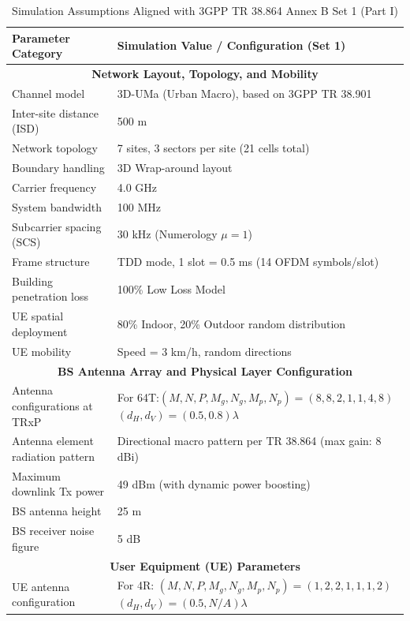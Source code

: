 \begin{table}[htbp]
\centering
\caption{Simulation Assumptions Aligned with 3GPP TR 38.864 Annex B Set 1 (Part I)}
\label{tab:appendix_3gpp_set1_part1}
\renewcommand{\arraystretch}{1.25}
\begin{tabularx}{\textwidth}{|p{}|X|}
\hline
\textbf{Parameter Category} & \textbf{Simulation Value / Configuration (Set 1)} \\ \hline
\multicolumn{2}{|c|}{\textbf{Network Layout, Topology, and Mobility}} \\ \hline
Channel model & 3D-UMa (Urban Macro), based on 3GPP TR 38.901 \\ \hline
Inter-site distance (ISD) & 500 m \\ \hline
Network topology & 7 sites, 3 sectors per site (21 cells total) \\ \hline
Boundary handling & 3D Wrap-around layout \\ \hline
Carrier frequency & 4.0 GHz \\ \hline
System bandwidth & 100 MHz \\ \hline
Subcarrier spacing (SCS) & 30 kHz (Numerology $\mu = 1$) \\ \hline
Frame structure & TDD mode, 1 slot = 0.5 ms (14 OFDM symbols/slot) \\ \hline
Building penetration loss & 100\% Low Loss Model \\ \hline
UE spatial deployment & 80\% Indoor, 20\% Outdoor random distribution \\ \hline
UE mobility & Speed = 3 km/h, random directions \\ \hline
\multicolumn{2}{|c|}{\textbf{BS Antenna Array and Physical Layer Configuration}} \\ \hline
Antenna configurations  at TRxP & For 64T:\newline $(M, N, P, M_g, N_g, M_p, N_p) = (8, 8, 2, 1, 1, 4, 8)$ \newline $(d_H, d_V) = (0.5, 0.8)\lambda$ \\ \hline
Antenna element radiation pattern & Directional macro pattern per TR 38.864 (max gain: 8 dBi) \\ \hline
Maximum downlink Tx power & 49 dBm (with dynamic power boosting) \\ \hline
BS antenna height & 25 m \\ \hline
BS receiver noise figure & 5 dB \\ \hline
\multicolumn{2}{|c|}{\textbf{User Equipment (UE) Parameters}} \\ \hline
UE antenna configuration & 
  For 4R: $(M, N, P, M_g, N_g, M_p, N_p) = (1, 2, 2, 1, 1, 1, 2)$  \newline $(d_H, d_V) = (0.5, N/A)\lambda$ \\ \hline


\end{tabularx}
\end{table}
